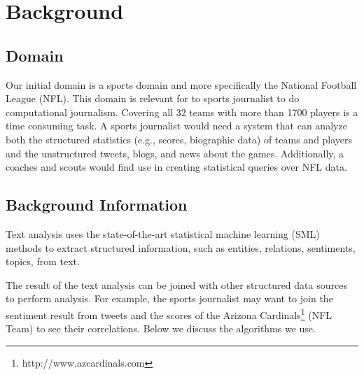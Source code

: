 \documentclass[11pt]{article}
\begin{document}
  \section{Background}
  \subsection{Domain}

  Our initial domain is a sports domain and more specifically the National Football League (NFL).
  This domain is relevant for to sports journalist to do computational journalism.
  Covering all 32 teams with more than 1700 players is a time consuming task.
  A sports journalist would need a system
  that can analyze both the
  structured statistics (e.g., scores, biographic data) of teams and players and the
  unstructured tweets, blogs, and news about the games.
	Additionally, a coaches and scouts would find use in creating statistical queries over NFL data.



  \subsection{Background Information}



    Text analysis uses the state-of-the-art statistical machine learning (SML) methods to extract structured information,
    such as entities, relations, sentiments, topics, from text.

    The result of the text analysis can be joined with other
    structured data sources to perform analysis. For example, the sports
    journalist may want to join the sentiment result from tweets and the
    scores of the Arizona Cardinals\footnote{http://www.azcardinals.com}
    (NFL Team) to see their correlations.
		Below we discuss the algorithms we use.
\end{document}
